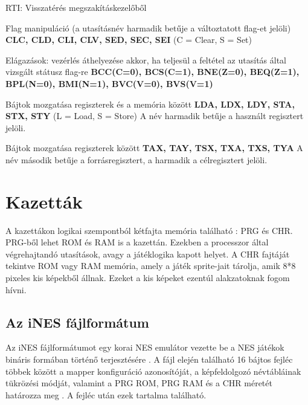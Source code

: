 \begin{compactdesc}
\begin{compactdesc}
		\item[RTI:] Visszatérés megszakításkezelőből
	\end{compactdesc}
	\item Flag manipuláció (a utasításnév harmadik betűje a változtatott flag-et jelöli) \newline \textbf{CLC, CLD, CLI, CLV, SED, SEC, SEI}
	\newline
	(C = Clear, S = Set)
	\item Elágazások: vezérlés áthelyezése akkor, ha teljesül a feltétel az utasítás által vizsgált státusz flag-re
	\newline \textbf{BCC(C=0), BCS(C=1), BNE(Z=0), BEQ(Z=1), BPL(N=0), BMI(N=1),  BVC(V=0), BVS(V=1)}
	\item Bájtok mozgatása regiszterek és a memória között
	\newline
	\textbf{LDA, LDX, LDY, STA, STX, STY} 
	\newline
	(L = Load, S = Store)
	\newline
	A név harmadik betűje a használt regisztert jelöli.
	\item Bájtok mozgatása regiszterek között
	\newline
	\textbf{TAX, TAY, TSX, TXA, TXS, TYA}
	\newline
	A név második betűje a forrásregisztert, a harmadik a célregisztert jelöli.
\end{compactdesc}

\section{Kazetták}

A kazettákon logikai szempontból kétfajta memória található \cite{ref}: PRG és CHR.
PRG-ből lehet ROM és RAM is a kazettán. Ezekben a processzor által végrehajtandó utasítások, avagy a játéklogika kapott helyet. A CHR fajtáját tekintve ROM vagy RAM memória, amely a játék sprite-jait tárolja, amik 8*8 pixeles kis képekből állnak. Ezeket a kis képeket ezentúl alakzatoknak fogom hívni. 

\subsection{Az iNES fájlformátum}

Az iNES fájlformátumot egy korai NES emulátor vezette be a NES játékok bináris formában történő terjesztésére \cite{ref}. A fájl elején található 16 bájtos fejléc többek között a mapper konfiguráció azonosítóját, a képfeldolgozó névtábláinak tükrözési módját, valamint a PRG ROM, PRG RAM és a CHR méretét határozza meg \cite{ines}. A fejléc után ezek tartalma található.

